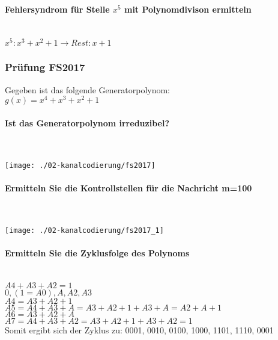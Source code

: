 \paragraph{Fehlersyndrom für Stelle $x^5$ mit Polynomdivison ermitteln}\mbox{}\\
$x^5:x^3+x^2+1 \rightarrow Rest: x+1$

\subsubsection{Prüfung FS2017}
Gegeben ist das folgende Generatorpolynom:\\
$g(x)=x^4+x^3+x^2+1$

\paragraph{Ist das Generatorpolynom irreduzibel?}\mbox{}\\
\begin{center}
    \vspace{-8pt}
    \texttt{[image: ./02-kanalcodierung/fs2017]}
    \vspace{-8pt}
\end{center}

\paragraph{Ermitteln Sie die Kontrollstellen für die Nachricht m=100}\mbox{}\\
\begin{center}
    \vspace{-8pt}
    \texttt{[image: ./02-kanalcodierung/fs2017\_1]}
    \vspace{-8pt}
\end{center}

\paragraph{Ermitteln Sie die Zyklusfolge des Polynoms}\mbox{}\\
$A4+A3+A2=1$\\
$0,(1=A0),A,A2,A3$\\

$A4=A3+A2+1$\\

$A5 = A4 + A3 + A = A3 + A2 + 1 +  A3 + A =  A2 + A + 1$\\
$A6= A3 + A2 + A$\\
$A7= A4 + A3 + A2 = A3 + A2 + 1 + A3 + A2 = 1$\\
Somit ergibt sich der Zyklus zu: 0001, 0010, 0100, 1000, 1101, 1110, 0001



